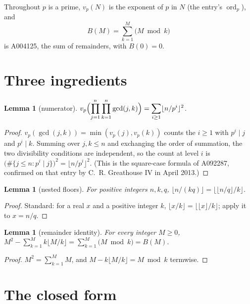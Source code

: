 \documentclass[11pt,a4paper]{article}
\theoremstyle{plain}
\newtheorem{lemma}[theorem]{Lemma}
\theoremstyle{definition}
\begin{document}
Throughout $p$ is a prime, $v_{p}(N)$ is the exponent of $p$ in $N$ (the entry's
$\operatorname{ord}_{p}$), and
\[
  B(M)=\sum_{k=1}^{M}\bigl(M\bmod k\bigr)
\]
is A004125, the sum of remainders, with $B(0)=0$.

\section{Three ingredients}

\begin{lemma}[numerator]\label{lem:num}
$\displaystyle v_{p}\Bigl(\prod_{j=1}^{n}\prod_{k=1}^{n}\gcd(j,k)\Bigr)
=\sum_{i\ge1}\lfloor n/p^{i}\rfloor^{2}$.
\end{lemma}

\begin{proof}
$v_{p}(\gcd(j,k))=\min(v_{p}(j),v_{p}(k))$ counts the $i\ge1$ with $p^{i}\mid j$ and
$p^{i}\mid k$. Summing over $j,k\le n$ and exchanging the order of summation, the two
divisibility conditions are independent, so the count at level $i$ is
$\bigl(\#\{j\le n:p^{i}\mid j\}\bigr)^{2}=\lfloor n/p^{i}\rfloor^{2}$. (This is the
square-case formula of A092287, confirmed on that entry by C.~R. Greathouse IV in April
2013.)
\end{proof}

\begin{lemma}[nested floors]\label{lem:floor}
For positive integers $n,k,q$, $\lfloor n/(kq)\rfloor=\lfloor\lfloor n/q\rfloor/k\rfloor$.
\end{lemma}

\begin{proof}
Standard: for a real $x$ and a positive integer $k$,
$\lfloor x/k\rfloor=\lfloor\lfloor x\rfloor/k\rfloor$; apply it to $x=n/q$.
\end{proof}

\begin{lemma}[remainder identity]\label{lem:rem}
For every integer $M\ge0$,
$\displaystyle M^{2}-\sum_{k=1}^{M}k\lfloor M/k\rfloor=\sum_{k=1}^{M}\bigl(M\bmod k\bigr)
=B(M)$.
\end{lemma}

\begin{proof}
$M^{2}=\sum_{k=1}^{M}M$, and $M-k\lfloor M/k\rfloor=M\bmod k$ termwise.
\end{proof}

\section{The closed form}
\end{document}
